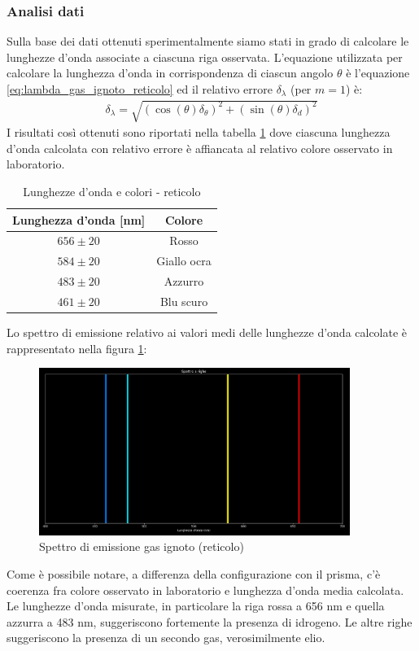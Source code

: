 \documentclass[a4paper]{article}
\begin{document}
\subsubsection{Analisi dati}
Sulla base dei dati ottenuti sperimentalmente siamo stati in grado di calcolare le lunghezze d'onda associate a ciascuna riga osservata. L'equazione utilizzata per calcolare la lunghezza d'onda in corrispondenza di ciascun angolo $\theta$ è l'equazione \ref{eq:lambda_gas_ignoto_reticolo} ed il relativo errore $\delta_\lambda$ (per $m=1$) è:
\begin{align}
\delta_\lambda=\sqrt{(\cos(\theta)\delta_\theta)^2+(\sin(\theta)\delta_d)^2}
\end{align}
I risultati così ottenuti sono riportati nella tabella \ref{tab:tabella_lunghezze_d'onda_reticolo} dove ciascuna lunghezza d'onda calcolata con relativo errore è affiancata al relativo colore osservato in laboratorio.
\begin{table}[htbp]
\centering
\begin{tabular}{|c|c|}
\hline
\textbf{Lunghezza d'onda [nm]} & \textbf{Colore} \\
\hline
$656 \pm 20$ & Rosso  \\
$584 \pm 20$ & Giallo ocra\\
$483 \pm 20$ & Azzurro \\
$461 \pm 20$ & Blu scuro \\
\hline
\end{tabular}
\caption{Lunghezze d'onda e colori - reticolo}
\label{tab:tabella_lunghezze_d'onda_reticolo}
\end{table}
Lo spettro di emissione relativo ai valori medi delle lunghezze d'onda calcolate è rappresentato nella figura \ref{fig:spettro_emissione_gas_ignoto_reticolo}:
\begin{figure}[htbp]
\centering
\includegraphics[width=0.9\textwidth]{grafici/spettro gas ignoto reticolo 300.png}
\caption{Spettro di emissione gas ignoto (reticolo)}
\label{fig:spettro_emissione_gas_ignoto_reticolo}
\end{figure}
Come è possibile notare, a differenza della configurazione con il prisma, c'è coerenza fra colore osservato in laboratorio e lunghezza d'onda media calcolata.
Le lunghezze d'onda misurate, in particolare la riga rossa a 656 nm e quella azzurra a 483 nm, suggeriscono fortemente la presenza di idrogeno. Le altre righe suggeriscono la presenza di un secondo gas, verosimilmente elio.
\end{document}
